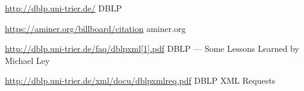 \documentclass{article}
\begin{document}
\begin{thebibliography}{1}

\url{http://dblp.uni-trier.de/} DBLP

\url{https://aminer.org/billboard/citation} aminer.org

\url{http://dblp.uni-trier.de/faq/dblpxml[1].pdf} DBLP — Some Lessons Learned by Michael Ley

\url{http://dblp.uni-trier.de/xml/docu/dblpxmlreq.pdf} DBLP XML Requests


\end{thebibliography}
\end{document}
